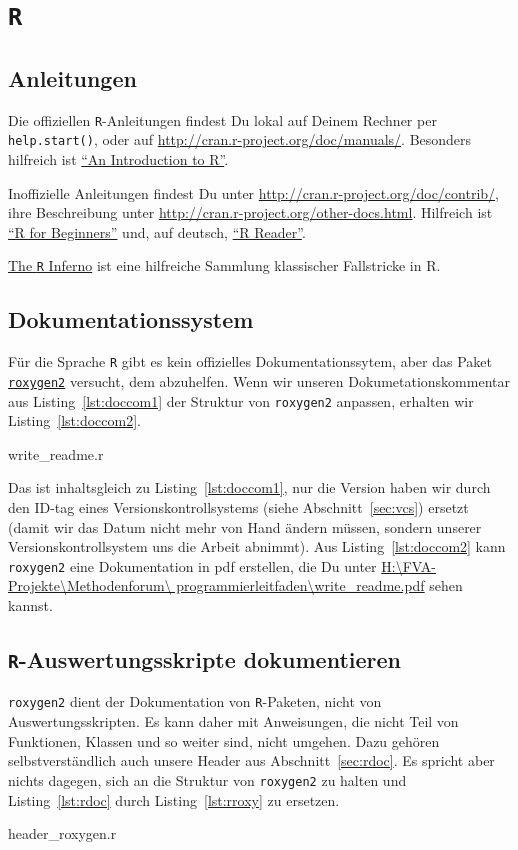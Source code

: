 \documentclass[twoside]{scrreprt}
\providecommand{\R}{\texttt{R}}
\providecommand{\code}[1]{\texttt{#1}}
\providecommand{\proot}{%
H:\textbackslash{}FVA-Projekte\textbackslash{}Methodenforum\textbackslash{}%
}
\providecommand{\pdir}{\proot{}programmierleitfaden\textbackslash{}}
\begin{document}
\section{\R{}}
\subsection{Anleitungen }
Die offiziellen  \R{}-Anleitungen findest Du lokal auf Deinem Rechner per 
\code{help.start()}, oder auf \url{http://cran.r-project.org/doc/manuals/}.
Besonders hilfreich ist 
\href{http://cran.r-project.org/doc/manuals/r-release/R-intro.pdf}
{"`An Introduction to R"'}.

Inoffizielle Anleitungen findest Du unter 
\url{http://cran.r-project.org/doc/contrib/}, ihre Beschreibung unter 
\url{http://cran.r-project.org/other-docs.html}. Hilfreich ist 
\href{http://cran.r-project.org/doc/contrib/Paradis-rdebuts_en.pdf}
{"`R for Beginners"'} 
und, auf deutsch, 
\href{http://cran.r-project.org/doc/contrib/Grosz+Peters-R-Reader.pdf}
{"`R Reader"'}.

\href{http://www.burns-stat.com/pages/Tutor/R_inferno.pdf}{The \R{} Inferno} ist
eine hilfreiche Sammlung klassischer Fallstricke in R. 

\subsection{Dokumentationssystem}
F\"u{}r die Sprache \R{}
gibt es kein offizielles Dokumentationssytem, aber 
das Paket \href{http://cran.r-project.org/web/packages/roxygen2/index.html}
{\code{roxygen2}} versucht, dem abzuhelfen. 
Wenn wir unseren Dokumetationskommentar aus Listing~\ref{lst:doccom1} der 
Struktur von \code{roxygen2} anpassen, erhalten wir Listing~\ref{lst:doccom2}.

%
{write_readme.r}

Das ist inhaltsgleich zu  Listing~\ref{lst:doccom1}, nur die Version haben wir 
durch den ID-tag eines Versionskontrollsystems (siehe Abschnitt~\ref{sec:vcs}) 
ersetzt (damit wir das Datum nicht mehr von Hand
\"a{}ndern m\"u{}ssen, sondern unserer Versionskontrollsystem uns die Arbeit
abnimmt).
Aus Listing~\ref{lst:doccom2}  kann \code{roxygen2} eine Dokumentation in pdf 
erstellen, die Du unter \href{write_readme.pdf}{\pdir{}write\_readme.pdf} sehen 
kannst.

\subsection{\R{}-Auswertungsskripte dokumentieren
\label{sec:documentation}}
\code{roxygen2} dient der Dokumentation von \R{}-Paketen, nicht von
Auswertungsskripten. Es kann daher mit Anweisungen, die nicht Teil von
Funktionen, Klassen und so weiter sind, nicht umgehen. Dazu geh\"oren
selbstverst\"a{}ndlich auch unsere Header aus Abschnitt~\ref{sec:rdoc}.
Es spricht aber nichts dagegen, sich an die Struktur von \code{roxygen2} zu
halten und Listing~\ref{lst:rdoc} durch Listing~\ref{lst:rroxy} zu ersetzen.

{header_roxygen.r}
\end{document}
